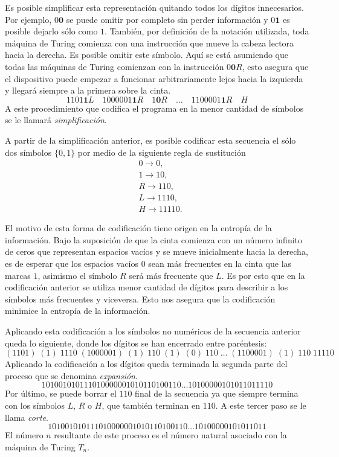 \documentclass[10pt,a4paper]{article}
\begin{document}
Es posible simplificar esta representación quitando todos los dígitos innecesarios. Por ejemplo, $0 \textbf{0}$ se puede omitir por completo sin perder información y $0 \textbf{1}$ es posible dejarlo sólo como $1$. También, por definición de la notación utilizada, toda máquina de Turing comienza con una instrucción que mueve la cabeza lectora hacia la derecha. Es posible omitir este símbolo. Aquí se está asumiendo que todas las máquinas de Turing comienzan con la instrucción $0 \textbf{0} R$, esto asegura que el dispositivo puede empezar a funcionar arbitrariamente lejos hacia la izquierda y llegará siempre a la primera sobre la cinta.
\[
	1101 \textbf{1} L \quad 1000001 \textbf{1} R \quad 1 \textbf{0} R \quad \dots \quad 1100001 \textbf{1} R \quad H
\]
A este procedimiento que codifica el programa en la menor cantidad de símbolos se le llamará \textit{simplificación}.

A partir de la simplificación anterior, es posible codificar esta secuencia el sólo dos símbolos $\{0,1\}$ por medio de la siguiente regla de sustitución
\begin{align*}
	&0 \rightarrow 0,\\
	&1 \rightarrow 10,\\
	&R \rightarrow 110,\\
	&L \rightarrow 1110,\\
	&H \rightarrow 11110.
\end{align*}

El motivo de esta forma de codificación tiene origen en la entropía de la información. Bajo la suposición de que la cinta comienza con un número infinito de ceros que representan espacios vacíos y se mueve inicialmente hacia la derecha, es de esperar que los espacios vacíos $0$ sean más frecuentes en la cinta que las marcas $1$, asimismo el símbolo $R$ será más frecuente que $L$. Es por esto que en la codificación anterior se utiliza menor cantidad de dígitos para describir a los símbolos más frecuentes y viceversa. Esto nos asegura que la codificación minimice la entropía de la información.

Aplicando esta codificación a los símbolos no numéricos de la secuencia anterior queda lo siguiente, donde los dígitos se han encerrado entre paréntesis:
\[
	(1101) \; (1) \; 1110 \; (1000001) \; (1) \; 110 \; (1) \; (0) \; 110 \; \dots \; (1100001) \; (1) \; 110 \; 11110
\]
Aplicando la codificación a los dígitos queda terminada la segunda parte del proceso que se denomina \textit{expansión}.
\[
	101001010111010000001010110100110 \dots 10100000101011011110
\]
Por último, se puede borrar el $110$ final de la secuencia ya que siempre termina con los símbolos $L$, $R$ o $H$, que también terminan en $110$. A este tercer paso se le llama \textit{corte}.
\[
	101001010111010000001010110100110 \dots 10100000101011011
\]
El número $n$ resultante de este proceso es el número natural asociado con la máquina de Turing $T_n$.
\end{document}
